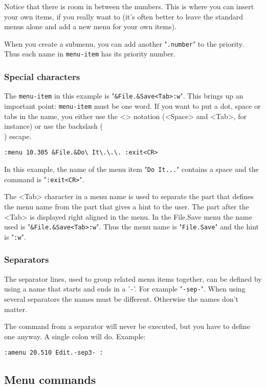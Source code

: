 Notice that there is room in between the numbers.
This is where you can insert your own items, if you really want to (it's often better to leave the standard menus alone and add a new menu for your own items).

When you create a submenu, you can add another "\texttt{.number}" to the priority.
Thus each name in \texttt{{menu-item}} has its priority number.

\subsubsection{Special characters}
The \texttt{{menu-item}} in this example is "\texttt{\&File.\&Save<Tab>:w}".
This brings up an important point: \texttt{{menu-item}} must be one word.
If you want to put a dot, space or tabs in the name, you either use the <> notation (<Space> and <Tab>, for instance) or use the backslash (\texttt{\\}) escape.

\begin{Verbatim}[samepage=true]
 :menu 10.305 &File.&Do\ It\.\.\. :exit<CR>
\end{Verbatim}

In this example, the name of the menu item "\texttt{Do It...}" contains a space and the command is "\texttt{:exit<CR>}".

The <Tab> character in a menu name is used to separate the part that defines the menu name from the part that gives a hint to the user.
The part after the <Tab> is displayed right aligned in the menu.
In the File.Save menu the name used is "\texttt{\&File.\&Save<Tab>:w}".
Thus the menu name is "\texttt{File.Save}" and the hint is "\texttt{:w}".

\subsubsection{Separators}
The separator lines, used to group related menu items together, can be defined by using a name that starts and ends in a '\texttt{-}'.
For example "\texttt{-sep-}".
When using several separators the names must be different.
Otherwise the names don't matter.

The command from a separator will never be executed, but you have to define one anyway.
A single colon will do.
Example:

\begin{Verbatim}[samepage=true]
 :amenu 20.510 Edit.-sep3- :
\end{Verbatim}
\subsection{Menu commands}

